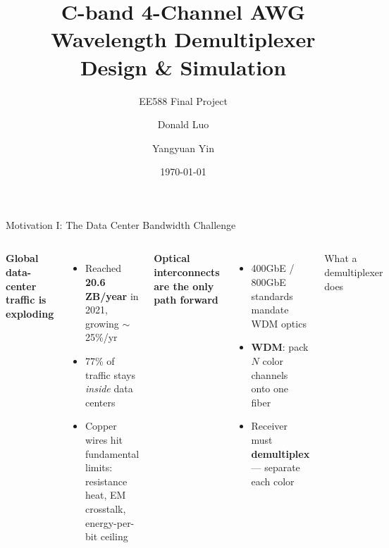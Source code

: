 \documentclass[aspectratio=169,10pt]{beamer}
\title[EE588 AWG]{C-band 4-Channel AWG Wavelength Demultiplexer\\Design \& Simulation}
\subtitle{EE588 Final Project}
\author{Donald Luo \and Yangyuan Yin}
\institute{University of Washington}
\date{\today}
\begin{document}
\begin{frame}
  \titlepage
\end{frame}

\begin{frame}{Motivation I: The Data Center Bandwidth Challenge}
  \begin{columns}[T]
      \textbf{Global data-center traffic is exploding}
      \begin{itemize}\setlength\itemsep{3pt}
        \item Reached \textbf{20.6 ZB/year} in 2021, growing $\sim$25\%/yr \footnotemark[1]
        \item 77\% of traffic stays \emph{inside} data centers
        \item Copper wires hit fundamental limits:\\
              {\small resistance heat, EM crosstalk, energy-per-bit ceiling}
      \end{itemize}
      \vspace{0.5em}
      \textbf{Optical interconnects are the only path forward}
      \begin{itemize}\setlength\itemsep{3pt}
        \item 400GbE / 800GbE standards mandate WDM optics \footnotemark[2]
        \item \textbf{WDM}: pack $N$ color channels onto one fiber
        \item Receiver must \textbf{demultiplex} — separate each color
      \end{itemize}
      \begin{block}{What a demultiplexer does}
        \centering
\end{block}
\end{columns}
\end{frame}
\end{document}
